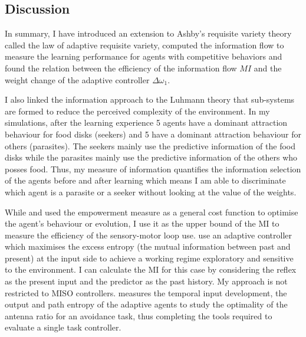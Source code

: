 \subsection{Discussion}
In summary, I have introduced an extension to Ashby's
requisite variety theory called the law of adaptive requisite variety,
computed the information flow to measure the learning performance for agents with
competitive behaviors and found the relation between the efficiency of the information flow $MI$ and the weight change
of the adaptive controller $\Delta \omega_1$.

I also linked the information approach to the Luhmann theory that sub-systems are formed
to reduce the perceived complexity of the environment.
In my simulations, after the learning experience 5 agents have a dominant
attraction behaviour for food disks (seekers) and 5 have a dominant attraction
behaviour for others (parasites).
The seekers mainly use the predictive information of the food disks while the
parasites mainly use the predictive information of the others who posses food.
Thus, my measure of information quantifies the information selection of the agents before and after learning which means I am able to discriminate which agent is a parasite or a seeker without looking at the value of the weights. 

While \citealt{organizationInfo,polaniEmpowerment} and \citealt{LungarellaInformation,Klyubin2008:KeepOptions}
used the empowerment measure as a general cost function to optimise the agent's
behaviour or evolution, I use it as the upper bound of the MI to measure the efficiency of the sensory-motor loop use.
\citet{Ay2008:PredInformation} use an adaptive controller which maximises
the excess entropy (the mutual information
between past and present) at the input side to achieve a working regime exploratory
and sensitive to the environment.
I can calculate the MI for this case by considering the reflex as the present input
and the predictor as the past history.
My approach is not restricted to MISO controllers.
\citet{Kulvicius2009:analysisdifferential} measures the temporal input development, the
output and path entropy of the adaptive agents to study the optimality of the antenna ratio for an avoidance task,
thus completing the tools required to evaluate a single task controller.

